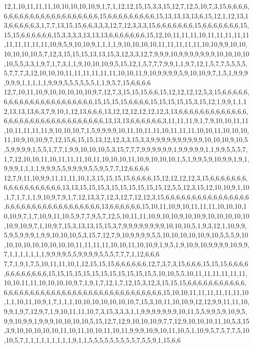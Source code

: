 12,1,10,11,11,11,10,10,10,10,10,9,1,7,1,12,12,15,15,3,3,15,12,7,12,5,10,7,3,15,6,6,6,6,6,6,6,6,6,6,6,6,6,6,6,6,6,6,6,6,6,6,15,6,6,6,6,6,6,6,6,6,15,13,13,13,13,6,15,12,1,12,13,13,6,6,6,6,6,3,1,7,7,13,15,15,6,6,3,3,3,12,7,12,3,3,3,15,6,6,6,6,6,6,6,15,6,6,6,6,6,6,6,15,15,15,6,6,6,6,6,6,15,3,3,3,3,13,13,13,6,6,6,6,6,6,6,15,12,10,11,11,11,10,11,11,11,11,11,11,11,11,11,11,10,9,5,9,10,10,9,1,1,1,1,9,10,10,10,10,11,11,11,11,11,10,10,9,9,10,10,10,10,10,10,5,7,12,3,15,15,15,13,13,15,3,12,3,3,12,7,9,9,9,10,9,9,9,9,9,9,9,10,10,10,10,10,5,5,3,3,1,9,7,1,7,3,1,1,9,10,10,10,9,5,15,12,1,5,7,7,7,9,9,1,1,9,7,12,1,5,7,7,5,5,5,5,5,7,7,7,3,12,10,10,10,11,11,11,11,11,11,10,10,11,9,10,9,9,9,9,5,9,10,10,9,7,1,5,1,9,9,9,9,9,9,1,1,1,1,1,9,9,9,5,5,5,5,5,5,1,1,9,5,7,15,6,6,6,6
12,7,10,11,10,9,10,10,10,10,10,9,7,12,7,3,15,15,15,6,6,15,12,12,12,12,5,3,15,6,6,6,6,6,6,6,6,6,6,6,6,6,6,6,6,6,6,6,6,6,6,15,15,15,15,6,6,6,6,15,15,15,15,15,3,15,12,1,9,9,1,1,12,13,13,13,6,3,7,9,10,1,12,13,6,6,6,13,12,12,12,12,12,12,3,13,6,6,6,6,6,6,6,6,6,6,6,6,6,6,6,6,6,6,6,6,6,6,6,6,6,6,6,6,6,6,6,6,13,13,13,6,6,6,6,6,6,3,11,11,11,9,1,7,9,10,10,11,11,10,11,11,11,11,9,10,10,10,7,1,5,9,9,9,9,10,11,10,11,11,10,11,11,11,10,10,11,10,10,10,11,10,9,10,10,9,7,12,15,6,15,15,13,12,12,3,3,15,3,3,9,9,9,9,9,9,9,9,9,9,10,10,10,9,10,5,5,9,9,9,9,1,5,5,1,7,7,1,9,9,10,10,10,5,3,15,7,7,7,9,9,9,9,9,9,1,9,9,9,9,9,1,1,9,9,5,5,5,7,1,7,12,10,10,11,10,11,11,11,10,11,10,10,10,11,10,9,10,10,10,1,5,1,9,9,5,9,10,9,9,1,9,1,9,9,9,1,1,1,1,9,9,9,5,5,9,9,9,9,5,5,9,5,7,7,12,6,6,6,6
12,7,9,11,10,9,9,11,11,11,10,1,3,15,15,15,15,6,6,6,6,15,12,12,12,12,3,15,6,6,6,6,6,6,6,6,6,6,6,6,6,6,6,6,6,6,13,13,15,15,15,3,15,15,15,15,15,15,12,5,5,12,3,15,12,10,10,9,1,10,1,7,1,7,1,1,9,10,9,7,9,1,7,12,13,3,7,12,3,12,7,12,12,3,15,6,6,6,6,6,6,6,6,6,6,6,6,6,6,6,6,6,6,6,6,6,6,6,6,6,6,6,6,6,6,6,6,6,6,13,6,6,6,6,6,6,15,10,11,10,9,10,11,11,11,10,10,10,10,10,9,7,1,7,10,9,11,10,5,9,7,7,9,5,7,12,5,10,11,11,10,9,10,10,9,10,10,9,10,10,10,10,10,10,9,10,9,7,1,10,9,7,15,3,13,13,15,15,3,7,9,9,9,9,9,9,9,9,10,10,10,5,1,9,3,12,1,10,9,9,5,9,5,9,9,9,1,9,9,10,10,10,5,3,15,7,12,7,9,10,9,9,9,9,5,5,10,10,10,10,10,9,10,5,5,5,9,10,10,10,10,10,10,10,10,10,11,11,11,11,10,10,11,10,10,9,1,9,5,1,9,10,9,10,9,9,9,9,10,9,9,7,1,1,1,1,1,1,1,9,9,9,9,5,5,9,9,9,9,5,5,5,7,7,7,1,12,6,6,6
7,7,1,9,1,7,5,10,11,11,10,1,12,15,15,15,6,6,6,6,6,6,12,7,3,7,3,15,6,6,6,15,15,15,6,6,6,6,6,6,6,6,6,6,6,6,15,15,15,15,15,15,15,15,15,15,15,15,5,10,10,5,5,10,11,11,11,11,11,11,10,10,11,11,10,10,10,10,9,7,1,9,1,7,12,1,7,12,15,3,12,3,15,15,15,6,6,6,6,6,6,6,6,6,6,6,6,6,6,6,6,6,6,6,6,6,6,6,6,6,6,6,6,6,6,6,6,6,6,6,6,6,6,6,6,6,15,10,10,11,11,11,11,11,11,10,1,1,10,11,10,9,1,7,1,1,1,10,10,10,10,10,10,10,7,15,3,10,11,10,10,9,12,12,9,9,11,11,10,9,9,1,9,7,12,9,7,1,9,10,11,11,10,7,3,15,3,3,3,1,1,9,9,9,9,9,9,9,10,11,5,5,9,9,5,9,10,9,5,9,9,10,9,9,1,9,9,9,10,10,10,10,5,15,12,7,12,9,10,10,10,9,7,7,12,9,10,10,10,11,10,5,3,15,3,9,10,10,10,10,10,11,10,11,10,10,11,10,11,9,9,9,10,9,10,11,10,5,1,10,9,5,7,5,7,7,5,10,10,5,7,1,1,1,1,1,1,1,1,1,9,1,1,5,5,5,5,5,5,5,5,5,7,5,5,9,1,15,6,6

